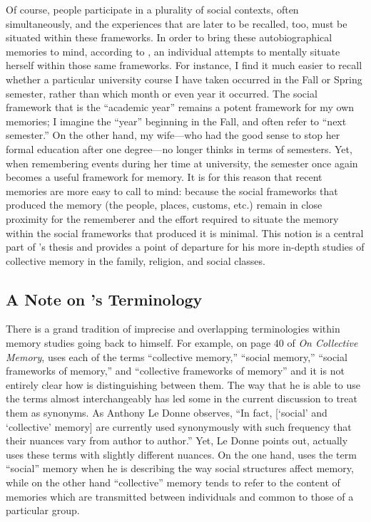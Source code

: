 Of course, people participate in a plurality of social contexts, often simultaneously, and the experiences that are later to be recalled, too, must be situated within these frameworks. In order to bring these autobiographical memories to mind, according to \halbwachs, an individual attempts to mentally situate herself within those same frameworks.\autocite[38]{halbwachs1992} For instance, I find it much easier to recall whether a particular university course I have taken occurred in the Fall or Spring semester, rather than which month or even year it occurred. The social framework that is the ``academic year'' remains a potent framework for my own memories; I imagine the ``year'' beginning in the Fall, and often refer to ``next semester.'' On the other hand, my wife---who had the good sense to stop her formal education after one degree---no longer thinks in terms of semesters. Yet, when remembering events during her time at university, the semester once again becomes a useful framework for memory. It is for this reason that recent memories are more easy to call to mind: because the social frameworks that produced the memory (the people, places, customs, etc.) remain in close proximity for the rememberer and the effort required to situate the memory within the social frameworks that produced it is minimal.\autocite[52]{halbwachs1992} This notion is a central part of \halbwachs's thesis and provides a point of departure for his more in-depth studies of collective memory in the family, religion, and social classes.  

\subsection{A Note on \halbwachs's Terminology}

There is a grand tradition of imprecise and overlapping terminologies within memory studies going back to \halbwachs himself. For example, on page 40 of \emph{On Collective Memory}, \halbwachs uses each of the terms ``collective memory,'' ``social memory,'' ``social frameworks of memory,'' and ``collective frameworks of memory'' and it is not entirely clear how \halbwachs is distinguishing between them. The way that he is able to use the terms almost interchangeably has led some in the current discussion to treat them as synonyms. As Anthony Le Donne observes, ``In fact, {[}`social' and `collective' memory{]} are currently used synonymously with such frequency that their nuances vary from author to author.''\autocite[42 n.8]{ledonne2009} Yet, Le Donne points out, \halbwachs actually uses these terms with slightly different nuances. On the one hand, \halbwachs uses the term ``social'' memory when he is describing the way social structures affect memory, while on the other hand ``collective'' memory tends to refer to the content of memories which are transmitted between individuals and common to those of a particular group.  

